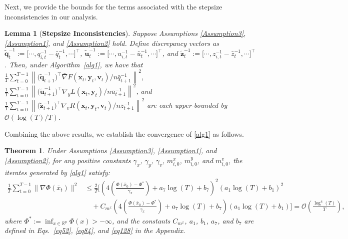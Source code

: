 \documentclass{article}
\theoremstyle{plain}
\newtheorem{theorem}{Theorem}[section]
\newtheorem{lemma}[lemma]{Lemma}
\theoremstyle{definition}
\theoremstyle{remark}
\begin{document}
Next, we provide the bounds for the terms associated with the stepsize inconsistencies in our analysis.
\begin{lemma}[\textbf{Stepsize Inconsistencies}] Suppose Assumptions \ref{Assumption3}, \ref{Assumption1}, and \ref{Assumption2} hold. Define discrepancy vectors as \(\tilde{\mathbf{q}}_t^{-1} \!\!:=\!\! \big[ \!\cdots, q_{i,t}^{-1}\!\! -\!\! \bar{q}_t^{-1}, \cdots \!\big]^\top\), \(\tilde{\mathbf{u}}_t^{-1} \!\!:=\!\! \big[ \!\cdots, u_{i,t}^{-1}\!\! -\!\! \bar{u}_t^{-1}, \cdots \!\big]^\top\), and \(\tilde{\mathbf{z}}_t^{-1} \!\!:=\!\! \big[ \!\cdots, z_{i,t}^{-1}\!\! -\!\! \bar{z}_t^{-1}, \cdots \!\big]^\top\). Then, under Algorithm~\ref{alg1}, we have that
$\frac{1}{T}\sum_{t=0}^{T-1} \left\| {\big(\tilde{\mathbf{q}}_{t+1}^{-1}\big)^{\top}} \bar{\nabla} F(\mathbf{x}_t, \mathbf{y}_t, \mathbf{v}_t)/{n\bar{q}_{t+1}^{-1}} \right\|^2$, $\frac{1}{T}\sum_{t=0}^{T-1} \left\| {\big(\tilde{\mathbf{u}}_{t+1}^{-1}\big)^\top} {\nabla}_y L(\mathbf{x}_t, \mathbf{y}_t)/{n\bar{u}_{t+1}^{-1}} \right\|^2$, and $\frac{1}{T}\sum_{t=0}^{T-1} \left\| {\big(\tilde{\mathbf{z}}_{t+1}^{-1}\big)^\top} \nabla_v R(\mathbf{x}_t, \mathbf{y}_t, \mathbf{v}_t) /n\bar{z}_{t+1}^{-1}\right\|^2$ are each upper-bounded by $\mathcal{O}\left({\log(T)}/{T}\right)$. 
\end{lemma}
\vspace{-0.2cm}

Combining the above results, we establish the convergence of \cref{alg1} as follows.
\begin{theorem}\label{theorem 1}
Under Assumptions \ref{Assumption3}, \ref{Assumption1}, and \ref{Assumption2}, for any positive constants $\gamma_x$, $\gamma_y$, $\gamma_v$, $m^x_{i,0}$,  $m^y_{i,0}$, and $m^v_{i,0}$, the iterates generated by \cref{alg1} satisfy:
\vspace{-0.19cm}
\begin{equation*}
\begin{aligned}
\frac{1}{T} \sum_{t=0}^{T-1} \|\nabla \Phi(\bar{x}_t)\|^2
&{\leq} \frac{2}{T}\!\Bigg[\!\!\left(\!{4}\!\left(\!\frac{\Phi(\bar{x}_0)\!-\!\Phi^*}{\gamma_x}\!\right)\!\!+\!a_7\log(T)\!\!+\!b_7\!\right)^{\!2}\!\!\!{(a_1\!\log(T) \!+\! b_1)^2}  \\
& \quad+ \!C_{m^x} \!\!\left(\!{4}\!\left(\!\frac{\Phi(\bar{x}_0)\!-\!\Phi^*}{\gamma_x}\!\right)\!\!+\!a_7\!\log(T)\!\!+\!b_7\!\right)\!(a_1\!\log(T)\!\!+\! b_1)\Bigg] \!=\! \mathcal{O}\left(\frac{\log^4(T)}{T}\right),
\end{aligned}
\end{equation*}
where $\Phi^* := \inf_{x \in \mathbb{R}^p} \Phi(x) > -\infty$, and the constants $C_{m^x}$, $a_1$, $b_1$, $a_7$, and $b_7$ are defined in Eqs.~\eqref{eq52}, \eqref{eq84}, and \eqref{eq128} in the Appendix.
\end{theorem}
\end{document}
